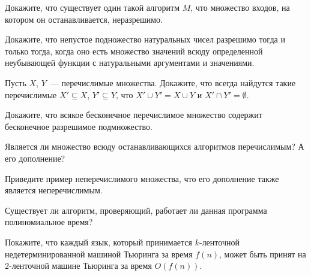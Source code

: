 
\begin{task}
	Докажите, что существует один такой алгоритм $M$, что множество входов, на котором он останавливается, неразрешимо.    
\end{task}

\begin{task}
    Докажите, что непустое подножество натуральных чисел разрешимо тогда и только тогда, когда оно есть множество значений всюду
    определенной неубывающей функции с натуральными аргументами и значениями.
\end{task}

\begin{task}
    Пусть $X$, $Y$~--- перечислимые множества. Докажите, что всегда найдутся такие перечислимые $X' \subseteq X$, $Y' \subseteq
    Y$, что $X' \cup Y' = X \cup Y$ и $X' \cap Y' = \emptyset$.
\end{task}

\begin{task}
	Докажите, что всякое бесконечное перечислимое множество содержит бесконечное разрешимое подмножество. 
\end{task}

\begin{task}
    Является ли множество всюду останавливающихся алгоритмов перечислимым? А его дополнение?
\end{task}

\begin{task}
    Приведите пример неперечислимого множества, что его дополнение также является неперечислимым.
\end{task}

\begin{task}
    Существует ли алгоритм, проверяющий, работает ли данная программа полиномиальное время?
\end{task}

\begin{task}
    Покажите, что каждый язык, который принимается $k$-ленточной недетерминированной машиной Тьюринга за время $f(n)$, может быть
    принят на $2$-ленточной машине Тьюринга за время $O(f(n))$.
\end{task}